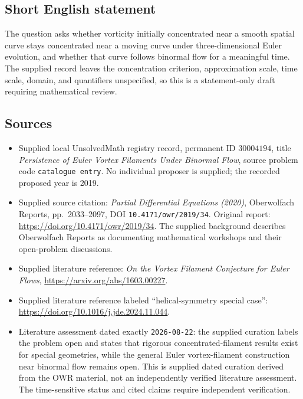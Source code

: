 \documentclass[11pt]{article}
\begin{document}
\subsection{Short English statement}
The question asks whether vorticity initially concentrated near a smooth spatial curve stays concentrated near a moving curve under three-dimensional Euler evolution, and whether that curve follows binormal flow for a meaningful time. The supplied record leaves the concentration criterion, approximation scale, time scale, domain, and quantifiers unspecified, so this is a statement-only draft requiring mathematical review.
\subsection{Sources}
\begin{itemize}
\item Supplied local UnsolvedMath registry record, permanent ID \(30004194\), title \emph{Persistence of Euler Vortex Filaments Under Binormal Flow}, source problem code \texttt{catalogue entry}. No individual proposer is supplied; the recorded proposed year is 2019.
\item Supplied source citation: \emph{Partial Differential Equations (2020)}, Oberwolfach Reports, pp.\ 2033--2097, DOI \texttt{10.4171/owr/2019/34}. Original report: \url{https://doi.org/10.4171/owr/2019/34}. The supplied background describes Oberwolfach Reports as documenting mathematical workshops and their open-problem discussions.
\item Supplied literature reference: \emph{On the Vortex Filament Conjecture for Euler Flows}, \url{https://arxiv.org/abs/1603.00227}.
\item Supplied literature reference labeled ``helical-symmetry special case'': \url{https://doi.org/10.1016/j.jde.2024.11.044}.
\item Literature assessment dated exactly \texttt{2026-08-22}: the supplied curation labels the problem open and states that rigorous concentrated-filament results exist for special geometries, while the general Euler vortex-filament construction near binormal flow remains open. This is supplied dated curation derived from the OWR material, not an independently verified literature assessment. The time-sensitive status and cited claims require independent verification.
\end{itemize}
\end{document}
